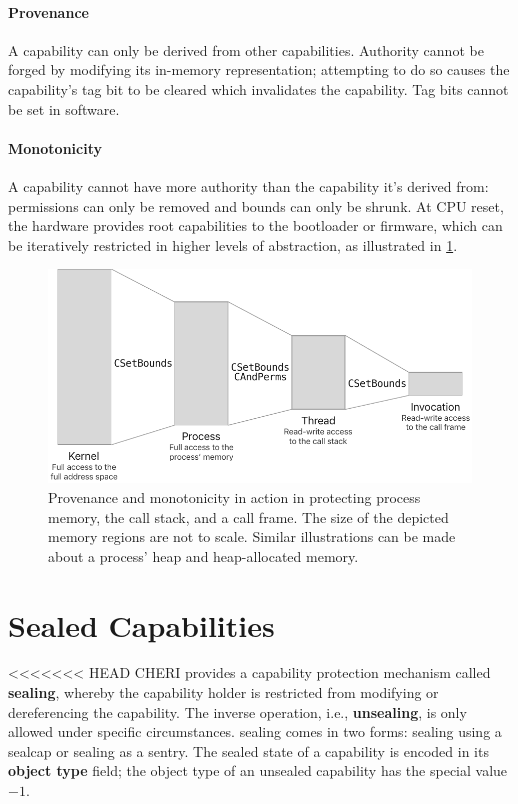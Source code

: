 \documentclass[main.tex]{subfiles}
\begin{document}
\paragraph{Provenance} A capability can only be derived from other capabilities. Authority cannot be forged by modifying its in-memory representation; attempting to do so causes the capability's tag bit to be cleared which invalidates the capability. Tag bits cannot be set in software.

\paragraph{Monotonicity} A capability cannot have more authority than the capability it's derived from: permissions can only be removed and bounds can only be shrunk. At CPU reset, the hardware provides root capabilities to the bootloader or firmware, which can be iteratively restricted in higher levels of abstraction, as illustrated in \cref{fig:derivingauth}.

\begin{figure}
	\centering
	\includegraphics{Images/Deriving Authority.pdf}
	\caption{Provenance and monotonicity in action in protecting process memory, the call stack, and a call frame. The size of the depicted memory regions are not to scale. Similar illustrations can be made about a process' heap and heap-allocated memory.}
	\label{fig:derivingauth}
\end{figure}

\section{Sealed Capabilities}
<<<<<<< HEAD
CHERI provides a capability protection mechanism called \textbf{\gls{sealing}}, whereby the capability holder is restricted from modifying or dereferencing the capability. The inverse operation, i.e., \textbf{\gls{unsealing}}, is only allowed under specific circumstances. \Gls{sealing} comes in two forms: \gls{sealing} using a \gls{sealcap} or \gls{sealing} as a \gls{sentry}. The sealed state of a capability is encoded in its \textbf{object type} field; the object type of an unsealed capability has the special value $-1$.
\end{document}
